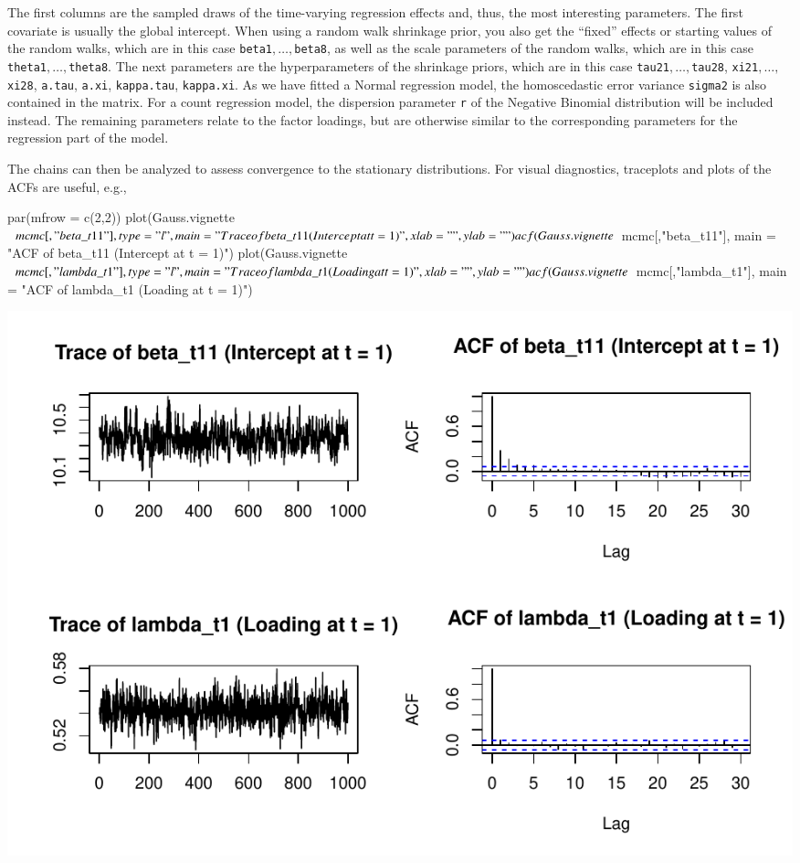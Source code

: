 \documentclass[a4paper, preprint, 3p,
authoryear]{elsarticle} %
\newenvironment{Shaded}{\begin{snugshade}}{\end{snugshade}}
\newcommand{\NormalTok}[1]{#1}
\newcommand{\pandocbounded}[1]{#1}
\begin{document}
The first columns are the sampled draws of the time-varying regression
effects and, thus, the most interesting parameters. The first covariate
is usually the global intercept. When using a random walk shrinkage
prior, you also get the ``fixed'' effects or starting values of the
random walks, which are in this case
\texttt{beta1}\(,\dots,\)\texttt{beta8}, as well as the scale parameters
of the random walks, which are in this case
\texttt{theta1}\(,\dots,\)\texttt{theta8}. The next parameters are the
hyperparameters of the shrinkage priors, which are in this case
\texttt{tau21}\(,\dots,\)\texttt{tau28},
\texttt{xi21}\(,\dots,\)\texttt{xi28}, \texttt{a.tau}, \texttt{a.xi},
\texttt{kappa.tau}, \texttt{kappa.xi}. As we have fitted a Normal
regression model, the homoscedastic error variance \texttt{sigma2} is
also contained in the matrix. For a count regression model, the
dispersion parameter \texttt{r} of the Negative Binomial distribution
will be included instead. The remaining parameters relate to the factor
loadings, but are otherwise similar to the corresponding parameters for
the regression part of the model.

The chains can then be analyzed to assess convergence to the stationary
distributions. For visual diagnostics, traceplots and plots of the ACFs
are useful, e.g.,

\begin{Shaded}
\begin{Highlighting}[]
\NormalTok{par(mfrow = c(2,2))}
\NormalTok{plot(Gauss.vignette$mcmc[,"beta\_t11"], type = "l", }
\NormalTok{     main = "Trace of beta\_t11 (Intercept at t = 1)", xlab = "", ylab = "")}
\NormalTok{acf(Gauss.vignette$mcmc[,"beta\_t11"],}
\NormalTok{    main = "ACF of beta\_t11 (Intercept at t = 1)")}
\NormalTok{plot(Gauss.vignette$mcmc[,"lambda\_t1"], type = "l", }
\NormalTok{     main = "Trace of lambda\_t1 (Loading at t = 1)", xlab = "", ylab = "")}
\NormalTok{acf(Gauss.vignette$mcmc[,"lambda\_t1"],}
\NormalTok{    main = "ACF of lambda\_t1 (Loading at t = 1)")}
\end{Highlighting}
\end{Shaded}

\pandocbounded{\includegraphics[keepaspectratio]{Vignette-for-panelTVP_files/figure-latex/unnamed-chunk-20-1.pdf}}
\end{document}
